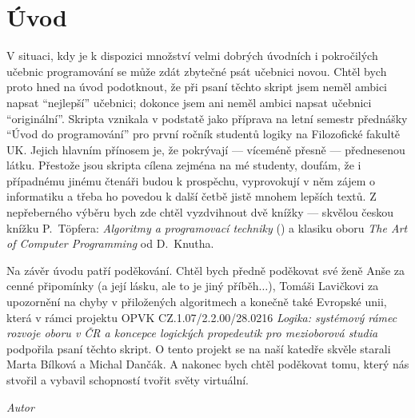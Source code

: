 \chapter*{Úvod}
V situaci, kdy je k dispozici množství velmi dobrých úvodních i pokročilých
učebnic programování se může zdát zbytečné psát učebnici novou. Chtěl bych
proto hned na úvod podotknout, že při psaní těchto skript jsem neměl ambici
napsat ``nejlepší'' učebnici; dokonce jsem ani neměl ambici napsat učebnici
``originální''. Skripta vznikala v podstatě jako příprava na letní semestr
přednášky ``Úvod do programování'' pro první ročník studentů logiky na
Filozofické fakultě UK. Jejich hlavním přínosem je, že pokrývají --- víceméně
přesně --- přednesenou látku. Přestože jsou skripta cílena zejména na
mé studenty, doufám, že i případnému jinému čtenáři budou k prospěchu,
vyprovokují v něm zájem o informatiku a třeba ho povedou k další četbě jistě
mnohem lepších textů. Z nepřeberného výběru bych zde chtěl vyzdvihnout dvě
knížky --- skvělou českou knížku P.~T\"opfera: \emph{Algoritmy a programovací techniky}
(\cite{Topfer:1995}) a klasiku oboru \emph{The Art of Computer Programming} od
D.~Knutha.

Na závěr úvodu patří poděkování. Chtěl bych předně poděkovat své ženě Anše
za cenné připomínky (a její lásku, ale to je jiný příběh$\ldots$), Tomáši
Lavičkovi za upozornění na chyby v přiložených algoritmech a konečně také
Evropské unii, která v rámci projektu OPVK CZ.1.07/2.2.00/28.0216
\emph{Logika: systémový rámec rozvoje oboru v ČR a koncepce logických
propedeutik pro mezioborová studia} podpořila psaní těchto skript. O tento
projekt se na naší katedře skvěle starali Marta Bílková a Michal Dančák.
A nakonec bych chtěl poděkovat tomu, který nás stvořil a vybavil schopností
tvořit světy virtuální.

\hfill \emph{Autor}



\ifx\ucebnice\undefined

\fi
